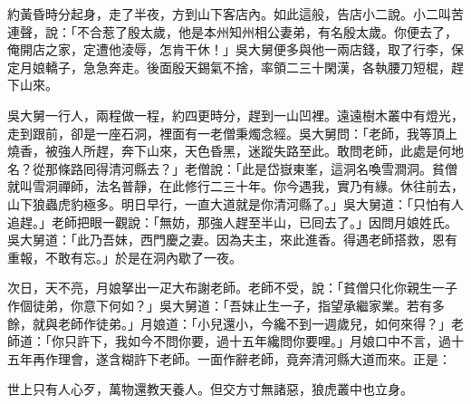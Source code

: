 約黃昏時分起身，走了半夜，方到山下客店內。{}如此這般，告店小二說。小二叫苦連聲，說：「不合惹了殷太歲，他是本州知州相公妻弟，有名殷太歲。你便去了，俺開店之家，定遭他淩辱，怎肯干休！」吳大舅便多與他一兩店錢，取了行李，保定月娘轎子，急急奔走。後面殷天錫氣不捨，率領二三十閑漢，各執腰刀短棍，趕下山來。

吳大舅一行人，兩程做一程，約四更時分，趕到一山凹裡。遠遠樹木叢中有燈光，走到跟前，卻是一座石洞，裡面有一老僧秉燭念經。吳大舅問：「老師，我等頂上燒香，被強人所趕，奔下山來，天色昏黑，迷蹤失路至此。敢問老師，此處是何地名？從那條路囘得清河縣去？」老僧說：「此是岱嶽東峯，這洞名喚雪澗洞。貧僧就叫雪洞禪師，法名普靜，在此修行二三十年。你今遇我，實乃有緣。休往前去，山下狼蟲虎豹極多。明日早行，一直大道就是你清河縣了。」吳大舅道：「只怕有人追趕。」老師把眼一觀說：「無妨，那強人趕至半山，已囘去了。」因問月娘姓氏。吳大舅道：「此乃吾妹，西門慶之妻。因為夫主，來此進香。得遇老師搭救，恩有重報，不敢有忘。」於是在洞內歇了一夜。

次日，天不亮，月娘拏出一疋大布謝老師。老師不受，說：「貧僧只化你親生一子作個徒弟，你意下何如？」{}吳大舅道：「吾妹止生一子，指望承繼家業。若有多餘，就與老師作徒弟。」月娘道：「小兒還小，今纔不到一週歲兒，如何來得？」老師道：「你只許下，我如今不問你要，過十五年纔問你要哩。」月娘口中不言，過十五年再作理會，遂含糊許下老師。一面作辭老師，竟奔清河縣大道而來。正是：

\begin{myquote}
世上只有人心歹，萬物還教天養人。但交方寸無諸惡，狼虎叢中也立身。
\end{myquote}

